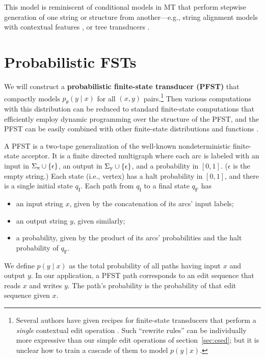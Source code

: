\documentclass[11pt,letterpaper]{article}
\newcommand{\Sigmax}{\Sigma_{\text x}}
\newcommand{\Sigmay}{\Sigma_{\text y}}
\newcommand{\ptheta}{{p_\theta}}
\newcommand{\SkipForSpace}[1]{}
\begin{document}
This model is reminiscent of conditional models in MT that perform stepwise generation of one string or structure from another---e.g., string alignment models with contextual features \cite{cherry2003probability,liu2005log,dyer2013simple}, or tree transducers \cite{knight-graehl-2005}.


\section{Probabilistic FSTs}\label{sec:pfst}

We will construct a {\bf probabilistic finite-state transducer (PFST)} that compactly models $\ptheta(y\mid x)$ for all $(x,y)$ pairs.\footnote{Several authors have given recipes for finite-state transducers that perform a {\em single} contextual edit operation \cite{kaplan1994regular,mohri1996efficient,gerdemann-vannoord-1999}.  Such ``rewrite rules'' can be individually more expressive than our simple edit operations of section~\ref{sec:csed}; but it is unclear how to train a cascade of them to model $p(y \mid x)$.}  Then various computations with this distribution can be reduced to standard finite-state computations that efficiently employ dynamic programming over the structure of the PFST, and the PFST can be easily combined with other finite-state distributions and functions \cite{mohri1997finite,eisner2001expectation}.

A PFST is a two-tape generalization of the well-known nondeterministic finite-state acceptor.  It is a finite directed multigraph where each arc is labeled with an input in $\Sigmax \cup \{\epsilon\}$, an output in $\Sigmay \cup \{\epsilon\}$, and a probability in $[0,1]$.  ($\epsilon$ is the empty string.)  Each state (i.e., vertex) has a halt probability in $[0,1]$, and there is a single initial state $q_{\text{I}}$.\SkipForSpace{\footnote{To put PFSTs into the more general computational framework of weighted automata \cite{mohri2002semiring}, the probabilities should be regarded as weights in the $(+,\times)$ semiring.}} Each path from 
$q_{\text{I}}$ to a final state $q_{\text{F}}$ has
\begin{itemize}[noitemsep]
\item an input string $x$, given by the concatenation of its arcs' input labels;
\item an output string $y$, given similarly;
\item a probability, given by the product of its arcs' probabilities and the halt probability of $q_{\text{F}}$.
\end{itemize}
We define $p(y \mid x)$ as the total probability of all paths having input $x$ and output $y$.
In our application, a PFST path corresponds to an edit sequence that reads $x$ and writes $y$.  The path's probability is the probability of that edit sequence given $x$.
\end{document}
